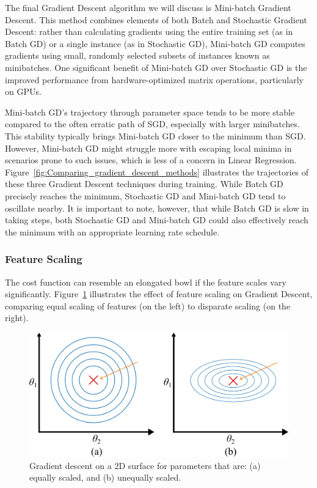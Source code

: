 \documentclass[12pt,letter]{article}
\begin{document}
The final Gradient Descent algorithm we will discuss is Mini-batch Gradient Descent. This method combines elements of both Batch and Stochastic Gradient Descent: rather than calculating gradients using the entire training set (as in Batch GD) or a single instance (as in Stochastic GD), Mini-batch GD computes gradients using small, randomly selected subsets of instances known as minibatches. One significant benefit of Mini-batch GD over Stochastic GD is the improved performance from hardware-optimized matrix operations, particularly on GPUs.

Mini-batch GD's trajectory through parameter space tends to be more stable compared to the often erratic path of SGD, especially with larger minibatches. This stability typically brings Mini-batch GD closer to the minimum than SGD. However, Mini-batch GD might struggle more with escaping local minima in scenarios prone to such issues, which is less of a concern in Linear Regression. Figure~\ref{fig:Comparing_gradient_descent_methods} illustrates the trajectories of these three Gradient Descent techniques during training. While Batch GD precisely reaches the minimum, Stochastic GD and Mini-batch GD tend to oscillate nearby. It is important to note, however, that while Batch GD is slow in taking steps, both Stochastic GD and Mini-batch GD could also effectively reach the minimum with an appropriate learning rate schedule.




\subsubsection{Feature Scaling}

The cost function can resemble an elongated bowl if the feature scales vary significantly. Figure~\ref{fig:gradient_descent_5} illustrates the effect of feature scaling on Gradient Descent, comparing equal scaling of features (on the left) to disparate scaling (on the right).

\begin{figure}[H]
    \centering
    \includegraphics[]{../figures/gradient_descent_5.png }
    \caption{Gradient descent on a 2D surface for parameters that are: (a) equally scaled, and (b) unequally scaled.}
    \label{fig:gradient_descent_5}
\end{figure}
\end{document}
